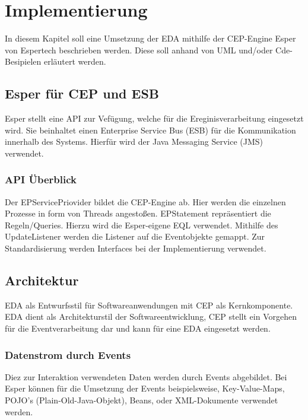 \chapter{Implementierung}

In diesem Kapitel soll eine Umsetzung der EDA mithilfe der CEP-Engine Esper von Espertech beschrieben werden.
Diese soll anhand von UML und/oder Cde-Besipielen erläutert werden.

\section{Esper für CEP und  ESB}

Esper stellt eine API zur Vefügung, welche für die Ereginisverarbeitung eingesetzt wird. Sie beinhaltet einen Enterprise Service Bus (ESB) für die Kommunikation innerhalb des Systems. Hierfür wird der Java Messaging Service (JMS) verwendet.

\subsection{API Überblick}

Der EPServicePriovider bildet die CEP-Engine ab. Hier werden die einzelnen Prozesse in form von Threads angestoßen.
EPStatement repräsentiert die Regeln/Queries. Hierzu wird die Esper-eigene EQL verwendet.
Mithilfe des UpdateListener werden die Listener auf die Eventobjekte gemappt. Zur Standardisierung werden Interfaces bei der Implementierung verwendet.

\section{Architektur}

EDA als Entwurfsstil für Softwareanwendungen mit CEP als Kernkomponente. EDA dient als Architekturstil der Softwareentwicklung, CEP stellt ein Vorgehen für die Eventverarbeitung dar und kann für eine EDA eingesetzt werden.

\subsection{Datenstrom durch Events}

Diez zur Interaktion verwendeten Daten werden durch Events abgebildet. Bei Esper können für die Umsetzung der Events beispielsweise, Key-Value-Maps, POJO's (Plain-Old-Java-Objekt), Beans, oder XML-Dokumente verwendet werden. \cite[13]{esperRef2016}	

